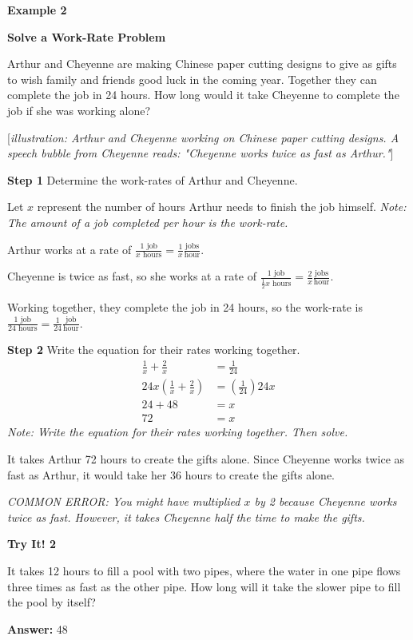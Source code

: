 \documentclass{article}
\newenvironment{example}[1]{\textbf{Example #1}\par}{\vspace{1em}}
\newenvironment{tryit}[1]{\textbf{Try It! #1}\par}{\vspace{1em}}
\newcommand{\answer}[1]{\par\textbf{Answer:} #1}
\newcommand{\placeholder}[2]{[\textit{#1: #2}]}
\begin{document}
\begin{example}{2}
\textbf{Solve a Work-Rate Problem}

Arthur and Cheyenne are making Chinese paper cutting designs to give as gifts to wish family and friends good luck in the coming year. Together they can complete the job in 24 hours. How long would it take Cheyenne to complete the job if she was working alone?

\placeholder{illustration}{Arthur and Cheyenne working on Chinese paper cutting designs. A speech bubble from Cheyenne reads: "Cheyenne works twice as fast as Arthur."}

\textbf{Step 1} Determine the work-rates of Arthur and Cheyenne.

Let $x$ represent the number of hours Arthur needs to finish the job himself.
\textit{Note: The amount of a job completed per hour is the work-rate.}

Arthur works at a rate of $\frac{1 \text{ job}}{x \text{ hours}} = \frac{1}{x} \frac{\text{jobs}}{\text{hour}}$.

Cheyenne is twice as fast, so she works at a rate of $\frac{1 \text{ job}}{\frac{1}{2}x \text{ hours}} = \frac{2}{x} \frac{\text{jobs}}{\text{hour}}$.

Working together, they complete the job in 24 hours, so the work-rate is $\frac{1 \text{ job}}{24 \text{ hours}} = \frac{1}{24} \frac{\text{job}}{\text{hour}}$.

\textbf{Step 2} Write the equation for their rates working together.
\begin{align*}
\frac{1}{x} + \frac{2}{x} &= \frac{1}{24} \\
24x\left(\frac{1}{x} + \frac{2}{x}\right) &= \left(\frac{1}{24}\right)24x \\
24 + 48 &= x \\
72 &= x
\end{align*}
\textit{Note: Write the equation for their rates working together. Then solve.}

It takes Arthur 72 hours to create the gifts alone. Since Cheyenne works twice as fast as Arthur, it would take her 36 hours to create the gifts alone.

\textit{COMMON ERROR: You might have multiplied $x$ by 2 because Cheyenne works twice as fast. However, it takes Cheyenne half the time to make the gifts.}
\end{example}

\begin{tryit}{2}
It takes 12 hours to fill a pool with two pipes, where the water in one pipe flows three times as fast as the other pipe. How long will it take the slower pipe to fill the pool by itself?
\answer{48 }
\end{tryit}
\end{document}
